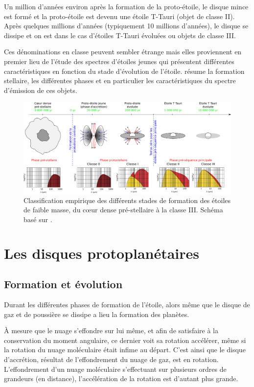 Un million d'années environ après la formation de la proto-étoile, le disque mince est formé et la proto-étoile est devenu une étoile T-Tauri (objet de classe II). Après quelques millions d'années (typiquement 10 millions d'années), le disque se dissipe et on est dans le cas d'étoiles T-Tauri évoluées ou objets de classe III. 

Ces dénominations en classe peuvent sembler étrange mais elles proviennent en premier lieu de l'étude des spectres d'étoiles jeunes qui présentent différentes caractéristiques en fonction du stade d'évolution de l'étoile.  résume la formation stellaire, les différentes phases et en particulier les caractéristiques du spectre d'émission de ces objets.
 
\begin{figure}[htbp]
\centering
\includegraphics[width=\linewidth]{figure/star_formation.pdf}
\caption{Classification empirique des différents stades de formation des étoiles de faible masse, du cœur dense pré-stellaire à la classe III. Schéma basé sur \citep{andre2002initial}. }\label{fig:star_formation}
\end{figure}


\section{Les disques protoplanétaires}


\subsection{Formation et évolution}
Durant les différentes phases de formation de l'étoile, alors même que le disque de gaz et de poussière se dissipe a lieu la formation des planètes. 

À mesure que le nuage s'effondre sur lui même, et afin de satisfaire à la conservation du moment angulaire, ce dernier voit sa rotation accélérer, même si la rotation du nuage moléculaire était infime au départ. C'est ainsi que le disque d'accrétion, résultat de l'effondrement du nuage de gaz, est en rotation. L'effondrement d'un nuage moléculaire s'effectuant sur plusieurs ordres de grandeurs (en distance), l'accélération de la rotation est d'autant plus grande.

